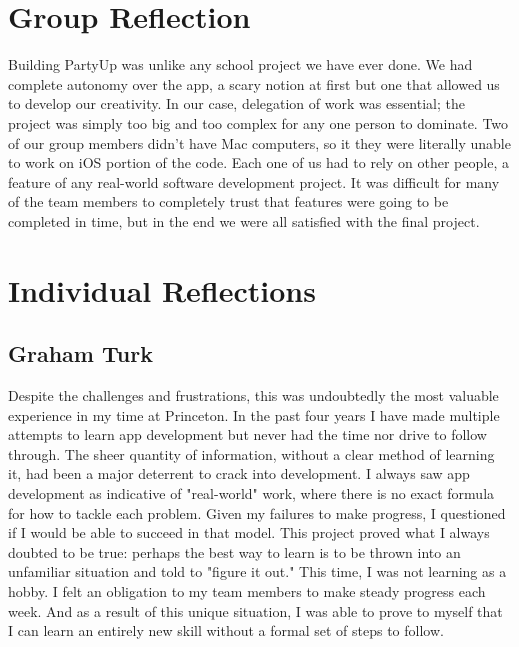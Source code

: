 \documentclass[12pt]{article}
\begin{document}
\section{Group Reflection}

Building PartyUp was unlike any school project we have ever done. 
We had complete autonomy over the app, a scary notion at first but one that allowed us to develop our creativity. 
In our case, delegation of work was essential; the project was simply too big and too complex for any one person to dominate. 
Two of our group members didn't have Mac computers, so it they were literally unable to work on iOS portion of the code. 
Each one of us had to rely on other people, a feature of any real-world software development project. 
It was difficult for many of the team members to completely trust that features were going to be completed in time, but in the end we were all satisfied with the final project.

\bigskip

\section{Individual Reflections}

\subsection{Graham Turk}

Despite the challenges and frustrations, this was undoubtedly the most valuable experience in my time at Princeton. In the past four years I have made multiple attempts to learn app development but never had the time nor drive to follow through. The sheer quantity of information, without a clear method of learning it, had been a major deterrent to crack into development. I always saw app development as indicative of "real-world" work, where there is no exact formula for how to tackle each problem. Given my failures to make progress, I questioned if I would be able to succeed in that model. This project proved what I always doubted to be true: perhaps the best way to learn is to be thrown into an unfamiliar situation and told to "figure it out." This time, I was not learning as a hobby. I felt an obligation to my team members to make steady progress each week. And as a result of this unique situation, I was able to prove to myself that I can learn an entirely new skill without a formal set of steps to follow. 
\end{document}
